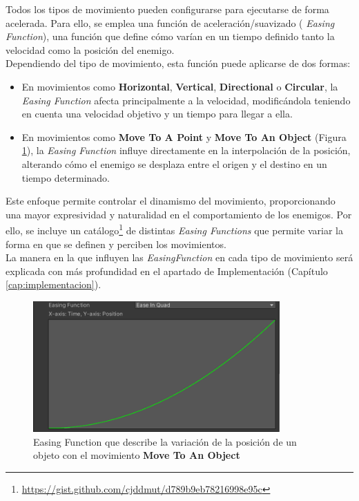 Todos los tipos de movimiento pueden configurarse para ejecutarse de forma acelerada. Para ello, se emplea una función de aceleración/suavizado ( \textit{Easing Function}), una función que define cómo varían en un tiempo definido tanto la velocidad como la posición del enemigo. \\
Dependiendo del tipo de movimiento, esta función puede aplicarse de dos formas:\\

\begin{itemize}
\item En movimientos como \textbf{Horizontal}, \textbf{Vertical}, \textbf{Directional} o \textbf{Circular}, la \textit{Easing Function} afecta principalmente a la velocidad, modificándola teniendo en cuenta una velocidad objetivo y un tiempo para llegar a ella.
\item En movimientos como \textbf{Move To A Point} y \textbf{Move To An Object} (Figura \ref{fig:EasingFunction}), la \textit{Easing Function} influye directamente en la interpolación de la posición, alterando cómo el enemigo se desplaza entre el origen y el destino en un tiempo determinado.
\end{itemize}

Este enfoque permite controlar el dinamismo del movimiento, proporcionando una mayor expresividad y naturalidad en el comportamiento de los enemigos. Por ello, se incluye un catálogo\footnote{\url{https://gist.github.com/cjddmut/d789b9eb78216998e95c}} de distintas \textit{Easing Functions} que permite variar la forma en que se definen y perciben los movimientos.\\

La manera en la que influyen las \textit{EasingFunction} en cada tipo de movimiento será explicada con más profundidad en el apartado de Implementación (Capítulo \ref{cap:implementacion}).

\begin{figure}[t]
	\centering
	\includegraphics[height=5cm]{Imagenes/EasingFunction.png}
	\caption{Easing Function que describe la variación de la posición de un objeto con el movimiento \textbf{Move To An Object}}
	\label{fig:EasingFunction}
\end{figure}


